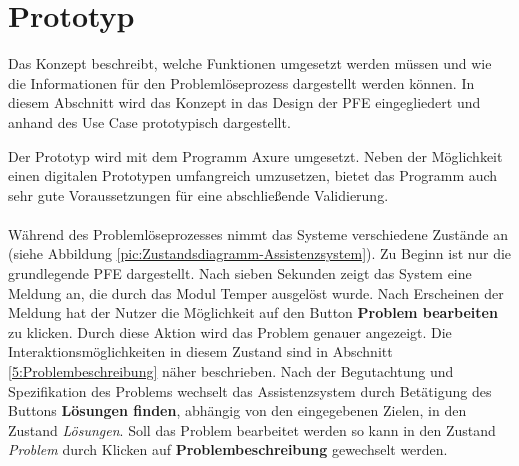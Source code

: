 \chapter{Prototyp}
\label{Prototyp}
Das Konzept beschreibt, welche Funktionen umgesetzt werden müssen und wie die Informationen für den Problemlöseprozess dargestellt werden können. In diesem Abschnitt wird das Konzept in das Design der PFE \cite{Hensel2019} eingegliedert und anhand des Use Case prototypisch dargestellt.

Der Prototyp wird mit dem Programm Axure \cite{axure} umgesetzt. Neben der Möglichkeit einen digitalen Prototypen umfangreich umzusetzen, bietet das Programm auch sehr gute Voraussetzungen für eine abschließende Validierung.
\\ \\
Während des Problemlöseprozesses nimmt das Systeme verschiedene Zustände an (siehe Abbildung \ref{pic:Zustandsdiagramm-Assistenzsystem}). Zu Beginn ist nur die grundlegende PFE dargestellt. Nach sieben Sekunden zeigt das System eine Meldung an, die durch das Modul Temper ausgelöst wurde. Nach Erscheinen der Meldung hat der Nutzer die Möglichkeit auf den Button \textbf{Problem bearbeiten} zu klicken. Durch diese Aktion wird das Problem genauer angezeigt. Die Interaktionsmöglichkeiten in diesem Zustand sind in Abschnitt \ref{5:Problembeschreibung} näher beschrieben. Nach der Begutachtung und Spezifikation des Problems wechselt das Assistenzsystem durch Betätigung des Buttons\textbf{ Lösungen finden}, abhängig von den eingegebenen Zielen, in den Zustand \textit{Lösungen}. Soll das Problem bearbeitet werden so kann in den Zustand \textit{Problem} durch Klicken auf \textbf{Problembeschreibung} gewechselt werden. 

